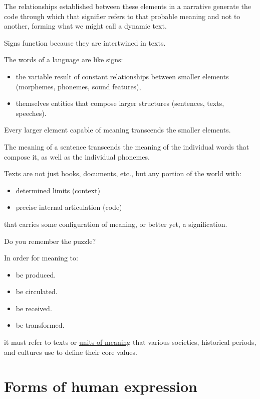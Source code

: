 The relationships established between these elements in a narrative generate the code through which that signifier refers to that probable meaning and not to another, forming what we might call a dynamic text.

Signs function because they are intertwined in texts.

The words of a language are like signs:

\begin{itemize}
\tightlist
\item the variable result of constant relationships between smaller elements (morphemes, phonemes, sound features),
\item themselves entities that compose larger structures (sentences, texts, speeches).
\end{itemize}

Every larger element capable of meaning transcends the smaller elements.

The meaning of a sentence transcends the meaning of the individual words that compose it, as well as the individual phonemes.

Texts are not just books, documents, etc., but any portion of the world with:

\begin{itemize}
\tightlist
\item determined limits (context)
\item precise internal articulation (code)
\end{itemize}

that carries some configuration of meaning, or better yet, a signification.

Do you remember the puzzle?

In order for meaning to:

\begin{itemize}
\tightlist
\item be produced.
\item be circulated.
\item be received.
\item be transformed.
\end{itemize}

it must refer to texts or \href{https://github.com/musicaecodice/EMC/blob/main/1_premises/suoni/storia1.mp4}{units of meaning} that various societies, historical periods, and cultures use to define their core values.

\section{Forms of human expression}\label{forms-of-human-expression}

